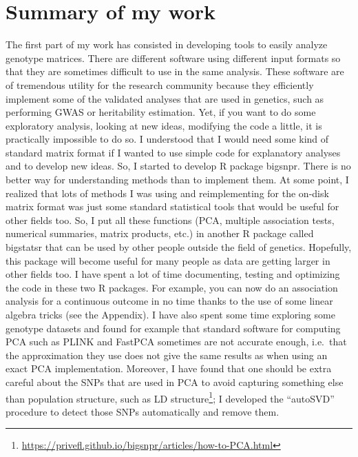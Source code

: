 \section{Summary of my work}

The first part of my work has consisted in developing tools to easily analyze genotype matrices.
There are different software using different input formats so that they are sometimes difficult to use in the same analysis.
These software are of tremendous utility for the research community because they efficiently implement some of the validated analyses that are used in genetics, such as performing GWAS or heritability estimation.
Yet, if you want to do some exploratory analysis, looking at new ideas, modifying the code a little, it is practically impossible to do so.
I understood that I would need some kind of standard matrix format if I wanted to use simple code for explanatory analyses and to develop new ideas.
So, I started to develop R package bigsnpr. There is no better way for understanding methods than to implement them. 
At some point, I realized that lots of methods I was using and reimplementing for the on-disk matrix format was just some standard statistical tools that would be useful for other fields too. 
So, I put all these functions (PCA, multiple association tests, numerical summaries, matrix products, etc.) in another R package called bigstatsr that can be used by other people outside the field of genetics. 
Hopefully, this package will become useful for many people as data are getting larger in other fields too. 
I have spent a lot of time documenting, testing and optimizing the code in these two R packages. 
For example, you can now do an association analysis for a continuous outcome in no time thanks to the use of some linear algebra tricks (see the Appendix).
I have also spent some time exploring some genotype datasets and found for example that standard software for computing PCA such as PLINK and FastPCA sometimes are not accurate enough, i.e.\ that the approximation they use does not give the same results as when using an exact PCA implementation. Moreover, I have found that one should be extra careful about the SNPs that are used in PCA to avoid capturing something else than population structure, such as LD structure\footnote{\url{https://privefl.github.io/bigsnpr/articles/how-to-PCA.html}}; I developed the ``autoSVD'' procedure to detect those SNPs automatically and remove them.

